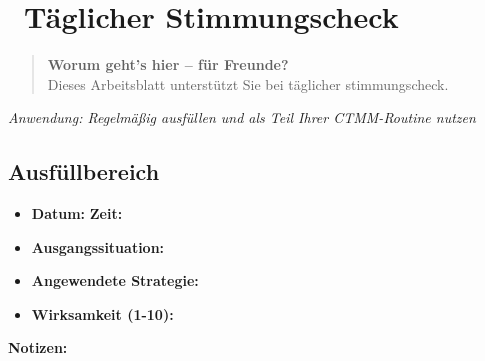 
\section*{\textcolor{ctmmGreen}{\faEdit~Täglicher Stimmungscheck}}

\begin{quote}
\textbf{\textcolor{ctmmGreen}{Worum geht's hier -- für Freunde?}}\\
Dieses Arbeitsblatt unterstützt Sie bei täglicher stimmungscheck.
\end{quote}

\textit{Anwendung: Regelmäßig ausfüllen und als Teil Ihrer CTMM-Routine nutzen}

\subsection*{\textcolor{ctmmGreen}{Ausfüllbereich}}

\begin{ctmmGreenBox}[title=Täglicher Stimmungscheck Dokumentation]
\begin{itemize}
  \item \textbf{Datum:} \underline{\hspace{3cm}} \textbf{Zeit:} \underline{\hspace{2cm}}
  \item \textbf{Ausgangssituation:} \underline{\hspace{5cm}}
  \item \textbf{Angewendete Strategie:} \underline{\hspace{5cm}}
  \item \textbf{Wirksamkeit (1-10):} \underline{\hspace{5cm}}
\end{itemize}

\vspace{0.5cm}
\textbf{Notizen:}\\
\underline{\hspace{\textwidth}}\\
\underline{\hspace{\textwidth}}\\
\underline{\hspace{\textwidth}}
\end{ctmmGreenBox}

